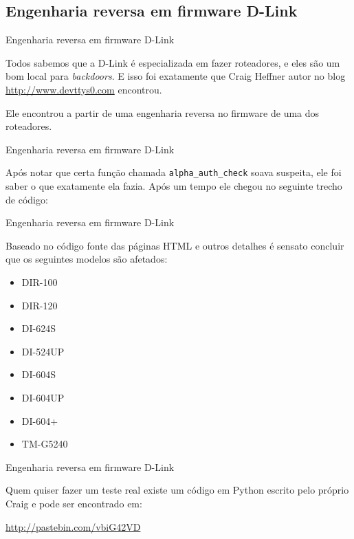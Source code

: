 \subsection{Engenharia reversa em firmware
D-Link}\label{engenharia-reversa-em-firmware-d-link}

\begin{frame}{Engenharia reversa em firmware D-Link}

Todos sabemos que a D-Link é especializada em fazer roteadores, e eles
são um bom local para \emph{backdoors}. E isso foi exatamente que Craig
Heffner autor no blog \url{http://www.devttys0.com} encontrou.

Ele encontrou a partir de uma engenharia reversa no firmware de uma dos
roteadores.

\end{frame}

\begin{frame}{Engenharia reversa em firmware D-Link}

Após notar que certa função chamada \texttt{alpha\_auth\_check} soava
suspeita, ele foi saber o que exatamente ela fazia. Após um tempo ele
chegou no seguinte trecho de código:


\end{frame}

\begin{frame}{Engenharia reversa em firmware D-Link}

Baseado no código fonte das páginas HTML e outros detalhes é sensato
concluir que os seguintes modelos são afetados:

\begin{itemize}
\itemsep1pt\parskip0pt
\item
  DIR-100
\item
  DIR-120
\item
  DI-624S
\item
  DI-524UP
\item
  DI-604S
\item
  DI-604UP
\item
  DI-604+
\item
  TM-G5240
\end{itemize}

\end{frame}

\begin{frame}{Engenharia reversa em firmware D-Link}

Quem quiser fazer um teste real existe um código em Python escrito pelo
próprio Craig e pode ser encontrado em:

\url{http://pastebin.com/vbiG42VD}


\end{frame}

